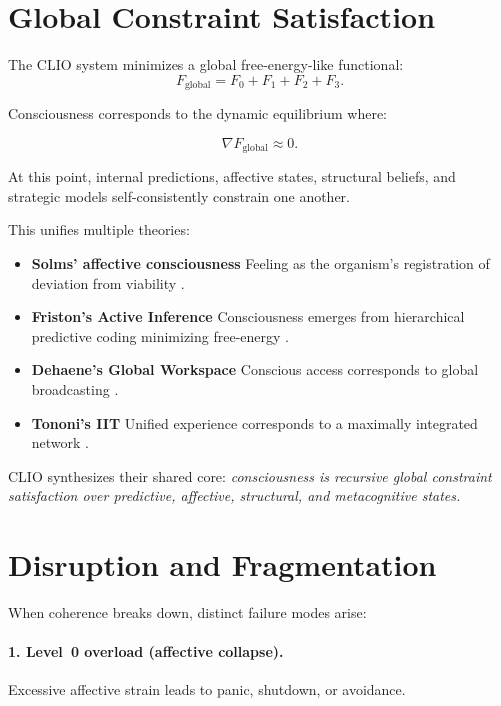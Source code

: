 \documentclass[12pt,oneside]{book}
\theoremstyle{plain}
\theoremstyle{definition}
\let\citep\parencite
\begin{document}
\section{Global Constraint Satisfaction}

The CLIO system minimizes a global free-energy-like functional:
\[
F_{\text{global}}
=
F_0 + F_1 + F_2 + F_3.
\]

Consciousness corresponds to the dynamic equilibrium where:

\[
\nabla F_{\text{global}} \approx 0.
\]

At this point, internal predictions, affective states, structural beliefs, and
strategic models self-consistently constrain one another.

This unifies multiple theories:

\begin{itemize}
  \item \textbf{Solms’ affective consciousness}
  Feeling as the organism's registration of deviation from viability
  \citep{solms2021hidden}.

  \item \textbf{Friston’s Active Inference}
  Consciousness emerges from hierarchical predictive coding minimizing
  free-energy \citep{friston2010freeenergy}.

  \item \textbf{Dehaene’s Global Workspace}
  Conscious access corresponds to global broadcasting \citep{dehaene2014consciousness}.

  \item \textbf{Tononi’s IIT}
  Unified experience corresponds to a maximally integrated network
  \citep{tononi2004phi}.
\end{itemize}

CLIO synthesizes their shared core:
\emph{consciousness is recursive global constraint satisfaction over predictive,
affective, structural, and metacognitive states.}

\section{Disruption and Fragmentation}

When coherence breaks down, distinct failure modes arise:

\paragraph{1. Level~0 overload (affective collapse).}
Excessive affective strain leads to panic, shutdown, or avoidance.
\end{document}
